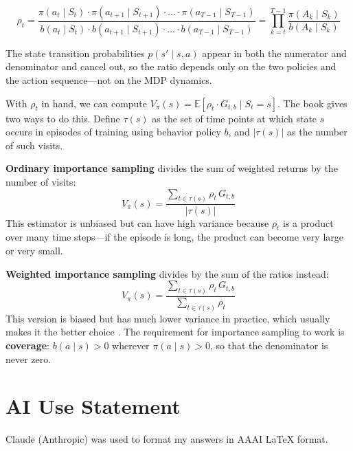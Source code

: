 \documentclass[letterpaper]{article}
\begin{document}
\[
\rho_t = \frac{\pi(a_t \mid S_t) \cdot \pi(a_{t+1} \mid S_{t+1}) \cdot \ldots \cdot \pi(a_{T-1} \mid S_{T-1})}{b(a_t \mid S_t) \cdot b(a_{t+1} \mid S_{t+1}) \cdot \ldots \cdot b(a_{T-1} \mid S_{T-1})}
= \prod_{k=t}^{T-1} \frac{\pi(A_k \mid S_k)}{b(A_k \mid S_k)}
\]

The state transition probabilities $p(s' \mid s, a)$ appear in both the numerator and denominator and cancel out, so the ratio depends only on the two policies and the action sequence---not on the MDP dynamics.

With $\rho_t$ in hand, we can compute $V_\pi(s) = \mathbb{E}\left[\rho_t \cdot G_{t,b} \mid S_t = s\right]$. The book gives two ways to do this. Define $\tau(s)$ as the set of time points at which state $s$ occurs in episodes of training using behavior policy $b$, and $|\tau(s)|$ as the number of such visits.

\textbf{Ordinary importance sampling} divides the sum of weighted returns by the number of visits:
\[
V_\pi(s) = \frac{\sum_{t \in \tau(s)} \rho_t \, G_{t,b}}{|\tau(s)|}
\]
This estimator is unbiased but can have high variance because $\rho_t$ is a product over many time steps---if the episode is long, the product can become very large or very small.

\textbf{Weighted importance sampling} divides by the sum of the ratios instead:
\[
V_\pi(s) = \frac{\sum_{t \in \tau(s)} \rho_t \, G_{t,b}}{\sum_{t \in \tau(s)} \rho_t}
\]
This version is biased but has much lower variance in practice, which usually makes it the better choice \citep{sutton2018reinforcement}. The requirement for importance sampling to work is \textbf{coverage}: $b(a \mid s) > 0$ wherever $\pi(a \mid s) > 0$, so that the denominator is never zero.

\section*{AI Use Statement}

Claude (Anthropic) was used to format my answers in AAAI LaTeX format.


\end{document}
